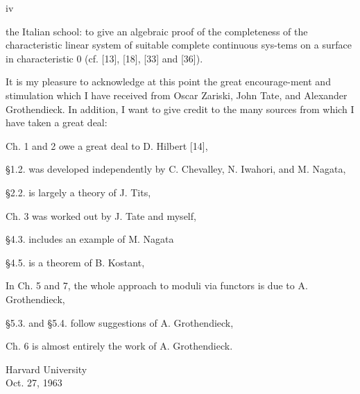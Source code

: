 \begin{center}iv\end{center}
the Italian school: to give an algebraic proof of the completeness of the characteristic linear system of suitable complete continuous sys-tems on a surface in characteristic 0 (cf. [13], [18], [33] and [36]).

It is my pleasure to acknowledge at this point the great encourage-ment and stimulation which I have received from Oscar Zariski, John Tate, and Alexander Grothendieck. In addition, I want to give credit to the many sources from which I have taken a great deal:

Ch. 1 and 2 owe a great deal to D. Hilbert [14],

\S1.2. was developed independently by C. Chevalley, N. Iwahori, and M. Nagata,

\S2.2. is largely a theory of J. Tits,

Ch. 3 was worked out by J. Tate and myself,

\S4.3. includes an example of M. Nagata

\S4.5. is a theorem of B. Kostant,

In Ch. 5 and 7, the whole approach to moduli via functors is due to A. Grothendieck,

\S5.3. and \S5.4. follow suggestions of A. Grothendieck,

Ch. 6 is almost entirely the work of A. Grothendieck.

\begin{flushright}Harvard University\\Oct. 27, 1963\end{flushright}
